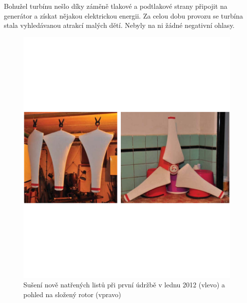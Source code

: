 Bohužel turbínu nešlo díky záměně tlakové a podtlakové strany připojit na generátor a získat nějakou elektrickou energii.
Za celou dobu provozu se turbína stala vyhledávanou atrakcí malých dětí. Nebyly na ni žádné negativní ohlasy.

\begin{figure}[H]
	\centering
	\includegraphics[]{obrazky/foto1}
	\caption{Sušení nově natřených listů při první údržbě v lednu 2012 (vlevo) a pohled na složený rotor (vpravo)}
	\label{foto1}
\end{figure}

